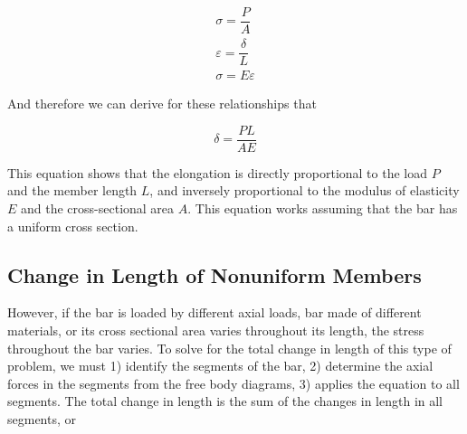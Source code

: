\documentclass[
10pt,
a4paper,
openany,
svgnames,
]{book} %
\begin{document}
\begin{gather}
 \sigma      = \dfrac{P}{A} \\
 \varepsilon = \dfrac{\delta}{L} \\
 \sigma      = E\varepsilon 
\end{gather}

And therefore we can derive for these relationships that

\begin{equation}
  \delta  = \frac{PL}{AE}
\end{equation}

This equation shows that the elongation is directly proportional to the load $P$ and the member length $L$, and inversely proportional to the modulus of elasticity $E$ and the cross-sectional area $A$. This equation works assuming that the bar has a uniform cross section.

\subsection{Change in Length of Nonuniform Members}

However, if the bar is loaded by different axial loads, bar made of different materials, or its cross sectional area varies throughout its length, the stress throughout the bar varies. To solve for the total change in length of this type of problem, we must 1) identify the segments of the bar, 2) determine the axial forces in the segments from the free body diagrams, 3) applies the equation to all segments. The total change in length is the sum of the changes in length in all segments, or

\begin{figure}[h]
  \centering
\end{figure}
\end{document}
